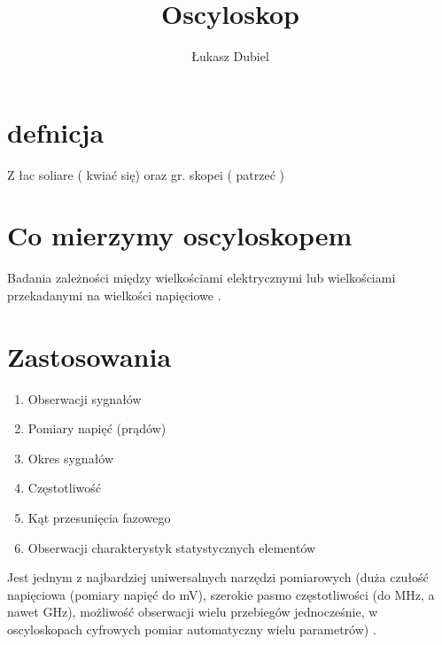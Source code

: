 \documentclass[11pt]{article}
\author{Łukasz Dubiel}
\title{Oscyloskop}
\begin{document}
\maketitle

\section{defnicja}
Z łac soliare ( kwiać się) oraz gr. skopei ( patrzeć ) 

\section{Co mierzymy oscyloskopem}
Badania zależności między wielkościami elektrycznymi lub wielkościami przekadanymi na wielkości napięciowe .

\section{Zastosowania}
\begin{enumerate}
\item{Obserwacji sygnałów}
\item{Pomiary napięć (prądów)}
\item{Okres sygnałów}
\item{Częstotliwość}
\item{Kąt przesunięcia fazowego}
\item{Obserwacji charakterystyk statystycznych elementów}
\end{enumerate}
Jest jednym z najbardziej uniwersalnych narzędzi pomiarowych (duża czułość napięciowa (pomiary napięć do mV), szerokie pasmo częstotliwości (do MHz, a nawet GHz), możliwość obserwacji wielu przebiegów jednocześnie, w oscyloskopach cyfrowych pomiar automatyczny wielu parametrów) .
\end{document}
